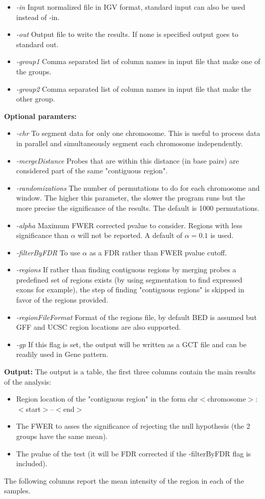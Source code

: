 \documentclass[11pt]{article}
\begin{document}
\begin{itemize}
\item {\em -in} Input normalized file in IGV format, standard input can also be used instead of -in.
\item {\em -out} Output file to write the results. If none is specified output goes to standard out.
\item {\em -group1} Comma separated list of column names in input file that make one of the groups.
\item {\em -group2} Comma separated list of column names in input file that make the other group.
\end{itemize}
{\bf Optional paramters:}
\begin{itemize}
\item {\em -chr} To segment data for only one chromosome. This is useful to process data in  parallel  and simultaneously segment each chromosome independently.
\item {\em -mergeDistance} Probes that are within this distance (in base pairs) are considered part of the same "contiguous region". 
\item {\em -randomizations} The number of permutations to do for each chromosome and window. The higher this parameter, the slower the program runs but the more precise the significance of the results. The default is 1000 permutations.
\item {\em -alpha} Maximum FWER corrected pvalue to consider. Regions with less significance than $\alpha$ will not be reported. A default of $\alpha=0.1$ is used.
\item {\em -filterByFDR} To use $\alpha$ as a FDR rather than FWER pvalue cutoff.
\item {\em -regions} If rather than finding contiguous regions by merging probes a predefined set of regions exists (by using segmentation to find expressed exons for example),  the step of finding "contiguous regions" is skipped in favor of the regions provided.
\item {\em -regionFileFormat} Format of the regions file, by default BED is assumed but GFF and UCSC region locations are also supported.
\item {\em -gp} If this flag is set, the output will be written as a GCT file and can be readily used in Gene pattern.
\end{itemize}

{\bf Output:} The output is a table, the first three columns contain the main results of the analysis:
\begin{itemize}
\item Region location of the "contiguous region" in the form chr$<$chromosome$>$:$<$start$>$--$<$end$>$
\item The FWER to asses the significance of rejecting the null hypothesis (the 2 groups have the same mean).
\item The pvalue of the test (it will be FDR corrected if the -filterByFDR flag is included).
\end{itemize}
The following columns report the mean intensity of the region in each of the samples.
\end{document}
